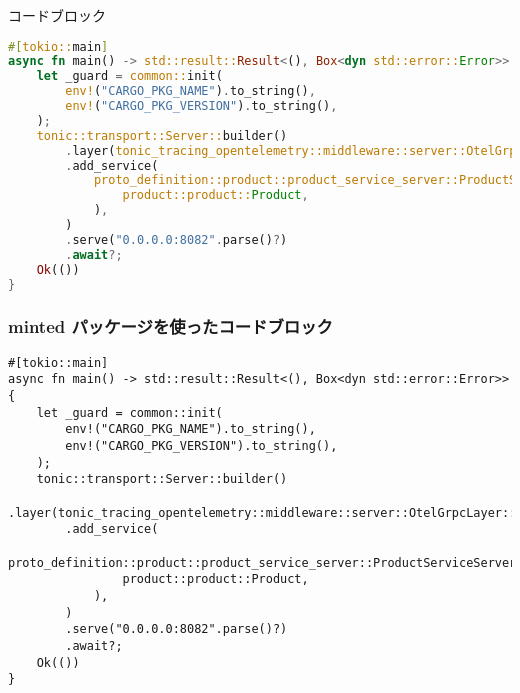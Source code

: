 \begin{frame}[fragile]{コードブロック}

    \begin{lstlisting}[caption=タイトル,language=Rust,style=mdRust,basicstyle=\scriptsize]
#[tokio::main]
async fn main() -> std::result::Result<(), Box<dyn std::error::Error>> {
    let _guard = common::init(
        env!("CARGO_PKG_NAME").to_string(),
        env!("CARGO_PKG_VERSION").to_string(),
    );
    tonic::transport::Server::builder()
        .layer(tonic_tracing_opentelemetry::middleware::server::OtelGrpcLayer::default())
        .add_service(
            proto_definition::product::product_service_server::ProductServiceServer::new(
                product::product::Product,
            ),
        )
        .serve("0.0.0.0:8082".parse()?)
        .await?;
    Ok(())
}
    \end{lstlisting}
\end{frame}


\begin{frame}[fragile]
    \frametitle{minted パッケージを使ったコードブロック}

    \begin{verbatim}
#[tokio::main]
async fn main() -> std::result::Result<(), Box<dyn std::error::Error>> {
    let _guard = common::init(
        env!("CARGO_PKG_NAME").to_string(),
        env!("CARGO_PKG_VERSION").to_string(),
    );
    tonic::transport::Server::builder()
        .layer(tonic_tracing_opentelemetry::middleware::server::OtelGrpcLayer::default())
        .add_service(
            proto_definition::product::product_service_server::ProductServiceServer::new(
                product::product::Product,
            ),
        )
        .serve("0.0.0.0:8082".parse()?)
        .await?;
    Ok(())
}
    \end{verbatim}

\end{frame}